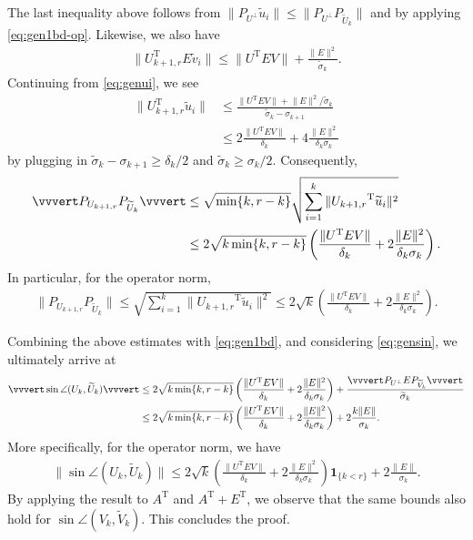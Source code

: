 \documentclass[reqno]{amsart}
\newcommand{\T}{\mathrm{T}}
\theoremstyle{plain}
\theoremstyle{definition}
\begin{document}
The last inequality above follows from $\| P_{U^\perp} \widetilde u_i\| \le \|P_{U^{\perp} } P_{\widetilde U_k}\|$ and by applying \eqref{eq:gen1bd-op}. Likewise, we also have
\begin{align*}
\| U_{k+1,r}^\T E \widetilde v_i\| \le \|U^\T E V\| + \frac{\|E\|^2}{\widetilde \sigma_k}.
\end{align*}
Continuing from \eqref{eq:genui}, we see
\begin{align*}
\|U_{k+1,r}^\T \widetilde u_i \| &\le \frac{\|U^\T E V\| + {\|E\|^2}/{\widetilde \sigma_k}}{\widetilde \sigma_k-\sigma_{k+1}}\\
&\le 2\frac{\|U^\T E V\| }{\delta_k} + 4\frac{\|E\|^2}{\delta_k \sigma_k}
\end{align*}
by plugging in $ \widetilde \sigma_k-\sigma_{k+1}\ge \delta_k/2$ and $\widetilde \sigma_k \ge \sigma_k/2$.
Consequently, 
\begin{align*}
\vvvert P_{U_{k+1,r} } P_{\widetilde U_k} \vvvert &\le \sqrt{\min\{k,r-k \}} \sqrt{\sum_{i=1}^k \|{U_{k+1,r} }^\T {\widetilde u_i}\|^2}\\
&\le 2\sqrt{k \min\{k,r-k \}}\left(\frac{\|U^\T E V\| }{\delta_k} + 2\frac{\|E\|^2}{\delta_k \sigma_k} \right).
\end{align*}
In particular, for the operator norm,
\begin{align*}
\|P_{U_{k+1,r} } P_{\widetilde U_k}\|\le \sqrt{\sum_{i=1}^k \|{U_{k+1,r} }^\T {\widetilde u_i}\|^2}\le 2 \sqrt{k} \left(\frac{\|U^\T E V\| }{\delta_k} + 2\frac{\|E\|^2}{\delta_k \sigma_k} \right).
\end{align*}

Combining the above estimates with \eqref{eq:gen1bd}, and considering \eqref{eq:gensin}, we ultimately arrive at
\begin{align*}
\vvvert \sin\angle (U_k, \widetilde U_k) \vvvert &\le 2 \sqrt{k \min\{k,r-k \}} \left(\frac{\|U^\T E V\| }{\delta_k} + 2\frac{\|E\|^2}{\delta_k \sigma_k} \right) + \frac{\vvvert P_{U^{\perp} } E P_{\widetilde V_k}  \vvvert }{\widetilde \sigma_k}\\
&\le 2 \sqrt{k \min\{k,r-k \}} \left(\frac{\|U^\T E V\| }{\delta_k} + 2\frac{\|E\|^2}{\delta_k \sigma_k} \right) + 2\frac{k \|E\| }{\sigma_k}.
\end{align*}
More specifically, for the operator norm, we have
\begin{align*}
\| \sin\angle (U_k, \widetilde U_k) \| \le 2 \sqrt{k} \left(\frac{\|U^\T E V\| }{\delta_k} + 2\frac{\|E\|^2}{\delta_k \sigma_k} \right)\mathbf{1}_{\{ k< r\}} + 2 \frac{\|E\|}{\sigma_k}.
\end{align*}
By applying the result to $A^\T$ and $A^\T + E^\T$, we observe that the same bounds also hold for $\sin\angle (V_k, \widetilde V_k)$. This concludes the proof. 
\end{document}
